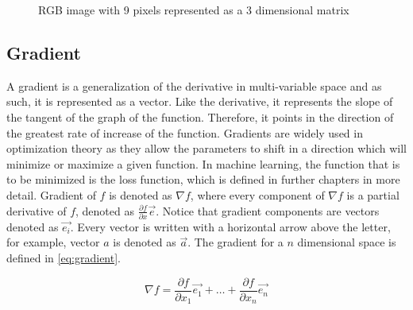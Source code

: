 \documentclass[times, utf8, diplomski]{fer}
\begin{document}
\begin{figure}
\centering
{}
\caption{RGB image with 9 pixels  represented as a 3 dimensional matrix}
\label{fig:image_matrix}
\end{figure}

\subsection{Gradient}
\label{se:gradient}
A gradient is a generalization of the derivative in multi-variable space and as such, it is represented as a vector. Like the derivative, it represents the slope of the tangent of the graph of the function. Therefore, it points in the direction of the greatest rate of increase of the function. Gradients are widely used in optimization theory as they allow the parameters to shift in a direction which will minimize or maximize a given function. In machine learning, the function that is to be minimized is the loss function, which is defined in further chapters in more detail. Gradient of $f$ is denoted as $\nabla{f}$, where every component of $\nabla{f}$ is a partial derivative of $f$, denoted as $\frac{\partial{f}}{\partial{x}}\vec{e}$. Notice that gradient components are vectors denoted as $\vec{e_i}$. Every vector is written with a horizontal arrow above the letter, for example, vector $a$ is denoted as $\vec{a}$. The gradient for a $n$ dimensional space is defined in \ref{eq:gradient}.


\begin{equation} \label{eq:gradient}
    \nabla{f}= \frac{\partial{f}}{\partial{x_{1}}}\vec{e_1} + \hdots +        \frac{\partial{f}}{\partial{x_{n}}}\vec{e_n}
\end{equation}
\end{document}
